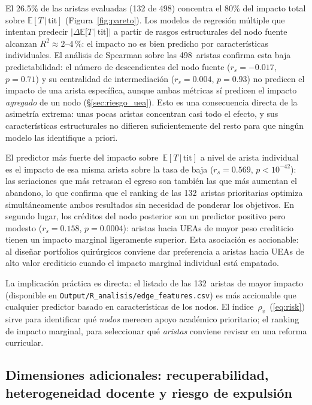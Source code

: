 \documentclass[11pt,letterpaper]{article}
\newcommand{\ETtit}{\mathbb{E}[T\,|\,\mathrm{tit}]}
\begin{document}
El 26.5\% de las aristas evaluadas (132 de 498) concentra el 80\% del impacto total
sobre $\ETtit$ (Figura~\ref{fig:pareto}).
Los modelos de regresión múltiple que intentan predecir $|\Delta\ETtit|$ a partir
de rasgos estructurales del nodo fuente alcanzan $R^2\approx 2$--$4\,\text{\%}$:
el impacto no es bien predicho por características individuales.
El análisis de Spearman sobre las 498~aristas confirma esta baja predictabilidad:
el número de descendientes del nodo fuente ($r_s = -0.017$, $p = 0.71$) y su
centralidad de intermediación ($r_s = 0.004$, $p = 0.93$) no predicen el impacto
de una arista específica, aunque ambas métricas sí predicen el impacto
\emph{agregado} de un nodo (\S\ref{sec:riesgo_uea}).
Esto es una consecuencia directa de la asimetría extrema: unas pocas aristas
concentran casi todo el efecto, y sus características estructurales no difieren
suficientemente del resto para que ningún modelo las identifique a priori.

El predictor más fuerte del impacto sobre~$\ETtit$ a nivel de arista individual
es el impacto de esa misma arista sobre la tasa de baja
($r_s = 0.569$, $p < 10^{-42}$): las seriaciones que más retrasan el egreso
son también las que más aumentan el abandono, lo que confirma que el ranking de
las 132~aristas prioritarias optimiza simultáneamente ambos resultados sin
necesidad de ponderar los objetivos.
En segundo lugar, los créditos del nodo posterior son un predictor positivo
pero modesto ($r_s = 0.158$, $p = 0.0004$): aristas hacia UEAs de mayor peso
crediticio tienen un impacto marginal ligeramente superior.
Esta asociación es accionable: al diseñar portfolios quirúrgicos conviene dar
preferencia a aristas hacia UEAs de alto valor crediticio cuando el impacto
marginal individual está empatado.

La implicación práctica es directa: el listado de las 132~aristas de mayor impacto
(disponible en \texttt{Output/R\_analisis/edge\_features.csv}) es más accionable
que cualquier predictor basado en características de los nodos.
El índice~$\rho_v$~(\ref{eq:risk}) sirve para identificar qué \emph{nodos} merecen
apoyo académico prioritario; el ranking de impacto marginal, para seleccionar qué
\emph{aristas} conviene revisar en una reforma curricular.

\subsection{Dimensiones adicionales: recuperabilidad, heterogeneidad docente
            y riesgo de expulsión}
\label{sec:dimensiones_adicionales}
\end{document}
